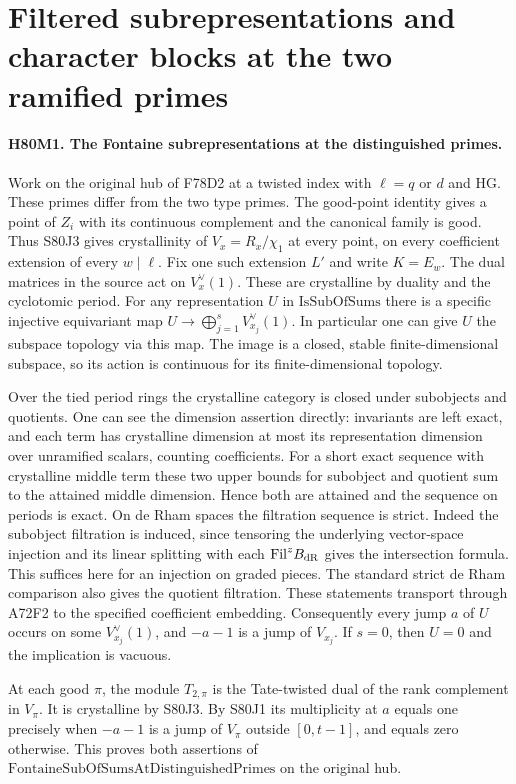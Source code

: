 \section{Filtered subrepresentations and character blocks at the two ramified primes}

\paragraph{H80M1. The Fontaine subrepresentations at the distinguished primes.}
Work on the original hub of F78D2 at a twisted index with
$\ell=q$ or $d$ and $\mathrm{HG}$. These primes differ from the two
type primes. The good-point identity gives a point of $Z_i$ with
its continuous complement and the canonical family is good. Thus
S80J3 gives crystallinity of $V_x=R_x/\chi_1$ at every point, on
every coefficient extension of every $w\mid\ell$. Fix one such
extension $L'$ and write $K=E_w$. The dual matrices in the source
act on $V_x^\vee(1)$. These are crystalline by duality and the
cyclotomic period. For any representation $U$ in
$\mathrm{IsSubOfSums}$ there is a specific injective equivariant
map $U\to\bigoplus_{j=1}^s V_{x_j}^\vee(1)$. In particular
one can give $U$ the subspace topology via this map. The image is
a closed, stable finite-dimensional subspace, so its action is
continuous for its finite-dimensional topology.

Over the tied period rings the crystalline category is closed under
subobjects and quotients. One can see the dimension assertion
directly: invariants are left exact, and each term has crystalline
dimension at most its representation dimension over unramified
scalars, counting coefficients. For a short exact sequence with
crystalline middle term these two upper bounds for subobject and
quotient sum to the attained middle dimension. Hence both are
attained and the sequence on periods is exact. On de Rham spaces
the filtration sequence is strict. Indeed the subobject filtration is
induced, since tensoring the underlying vector-space injection and
its linear splitting with each $\mathrm{Fil}^zB_{\rm dR}$ gives
the intersection formula. This suffices here for an injection on
graded pieces. The standard strict de Rham comparison also gives
the quotient filtration. These statements transport through A72F2
to the specified coefficient embedding. Consequently every jump $a$
of $U$ occurs on some $V_{x_j}^\vee(1)$, and $-a-1$ is a jump
of $V_{x_j}$. If $s=0$, then $U=0$ and the implication is vacuous.

At each good $\pi$, the module $T_{2,\pi}$ is the Tate-twisted
dual of the rank complement in $V_\pi$. It is crystalline by S80J3.
By S80J1 its multiplicity at $a$ equals one precisely when
$-a-1$ is a jump of $V_\pi$ outside $[0,t-1]$, and equals zero
otherwise. This proves both assertions of
$\mathrm{FontaineSubOfSumsAtDistinguishedPrimes}$ on the original hub.

